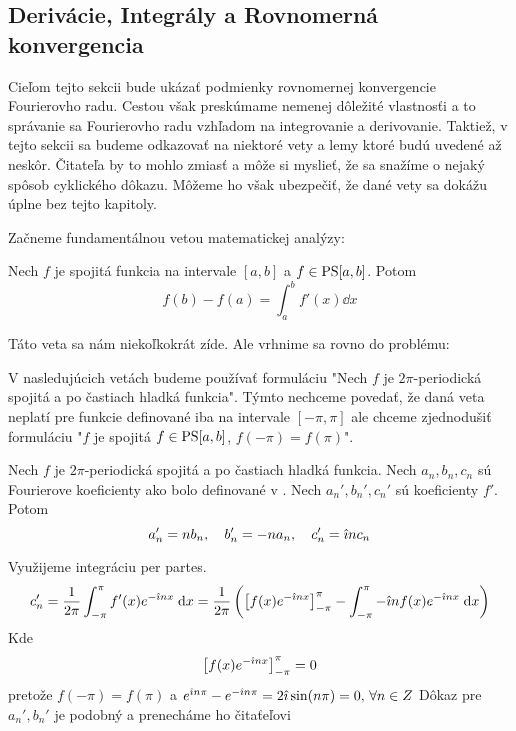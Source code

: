 \subsection{Derivácie, Integrály a Rovnomerná konvergencia}

Cieľom tejto sekcii bude ukázať podmienky rovnomernej konvergencie
Fourierovho radu. Cestou však preskúmame nemenej dôležité vlastnosťi
a to správanie sa Fourierovho radu vzhľadom na integrovanie a
derivovanie. Taktiež, v tejto sekcii sa budeme odkazovať na niektoré
vety a lemy ktoré budú uvedené až neskôr. Čitateľa by to mohlo zmiasť
a môže si myslieť, že sa snažíme o nejaký spôsob cyklického dôkazu.
Môžeme ho však ubezpečiť, že dané vety sa dokážu úplne bez tejto
kapitoly.

Začneme fundamentálnou vetou matematickej analýzy:
\begin{veta}
    Nech $f$ je spojitá funkcia na intervale $[a,b]$ a $f\in\mbox{PS}[a,b]$.
    Potom
    \begin{equation}
        f(b) - f(a) = \int_a^b f'(x) \dd x
    \end{equation}
\end{veta}
Táto veta sa nám niekoľkokrát zíde. Ale vrhnime sa rovno do problému:

\begin{poznamka}
    V nasledujúcich vetách budeme používať formuláciu "Nech $f$ je 
    $2\pi$-periodická spojitá a po častiach hladká funkcia". Týmto
    nechceme povedať, že daná veta neplatí pre funkcie definované iba
    na intervale $[-\pi,\pi]$ ale chceme zjednodušiť formuláciu
    "$f$ je spojitá $f\in\mbox{PS}[a,b]$, $f(-\pi)=f(\pi)$".
\end{poznamka}

\begin{veta}
    Nech $f$ je $2\pi$-periodická spojitá a po častiach hladká funkcia.
    Nech $a_n,b_n,c_n$ sú Fourierove koeficienty ako bolo definované
    v . Nech $a_n',b_n',c_n'$ sú koeficienty $f'$.
    Potom 
    \begin{equation}
        a_n' = n b_n, \quad b_n' = -n a_n, \quad c_n' = \hat{\imath} n c_n
    \end{equation}
    \label{veta:derivacia_koeficienty}
\end{veta}
\begin{dokaz}
    Využijeme integráciu per partes.
    \begin{equation}
      c_n' = \frac{1}{2\pi} \int_{-\pi}^{\pi} f'(x) e^{-\hat{\imath} n x} \; \mathrm{d} x =
        \frac{1}{2\pi} \left(
          \left[ f(x) e^{-\hat{\imath} n x}\right]_{-\pi}^{\pi} -
          \int_{-\pi}^{\pi} -\hat{\imath} n f(x) e^{-\hat{\imath} n x} \; \mathrm{d} x
          \right)
    \end{equation}
    Kde
    \begin{equation}
          \left[ f(x) e^{-\hat{\imath} n x}\right]_{-\pi}^{\pi} = 0
    \end{equation}
    pretože $f(-\pi)=f(\pi)$ a $e^{\hat{\imath} n \pi} - e^{-\hat{\imath} n \pi} =
    2\hat{\imath} \sin(n \pi) = 0, \,
    \forall n\in Z$
    Dôkaz pre $a_n',b_n'$ je podobný a prenecháme ho čitaťeľovi
\end{dokaz}

